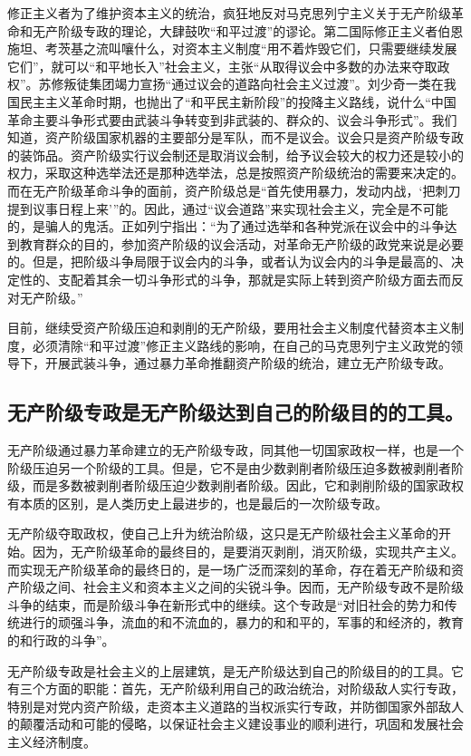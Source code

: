 \documentclass{book}
\begin{document}
修正主义者为了维护资本主义的统治，疯狂地反对马克思列宁主义关于无产阶级革命和无产阶级专政的理论，大肆鼓吹“和平过渡”的谬论。第二国际修正主义者伯恩施坦、考茨基之流叫嚷什么，对资本主义制度“用不着炸毁它们，只需要继续发展它们”，就可以“和平地长入”社会主义，主张“从取得议会中多数的办法来夺取政权”。苏修叛徒集团竭力宣扬“通过议会的道路向社会主义过渡”。刘少奇一类在我国民主主义革命时期，也抛出了“和平民主新阶段”的投降主义路线，说什么“中国革命主要斗争形式要由武装斗争转变到非武装的、群众的、议会斗争形式”。我们知道，资产阶级国家机器的主要部分是军队，而不是议会。议会只是资产阶级专政的装饰品。资产阶级实行议会制还是取消议会制，给予议会较大的权力还是较小的权力，采取这种选举法还是那种选举法，总是按照资产阶级统治的需要来决定的。而在无产阶级革命斗争的面前，资产阶级总是“首先使用暴力，发动内战，‘把刺刀提到议事日程上来’”的。因此，通过“议会道路”来实现社会主义，完全是不可能的，是骗人的鬼活。正如列宁指出：“为了通过选举和各种党派在议会中的斗争达到教育群众的目的，参加资产阶级的议会活动，对革命无产阶级的政党来说是必要的。但是，把阶级斗争局限于议会内的斗争，或者认为议会内的斗争是最高的、决定性的、支配着其余一切斗争形式的斗争，那就是实际上转到资产阶级方面去而反对无产阶级。”

目前，继续受资产阶级压迫和剥削的无产阶级，要用社会主义制度代替资本主义制度，必须清除“和平过渡”修正主义路线的影响，在自己的马克思列宁主义政党的领导下，开展武装斗争，通过暴力革命推翻资产阶级的统治，建立无产阶级专政。

\subsection{无产阶级专政是无产阶级达到自己的阶级目的的工具。}

无产阶级通过暴力革命建立的无产阶级专政，同其他一切国家政权一样，也是一个阶级压迫另一个阶级的工具。但是，它不是由少数剥削者阶级压迫多数被剥削者阶级，而是多数被剥削者阶级压迫少数剥削者阶级。因此，它和剥削阶级的国家政权有本质的区别，是人类历史上最进步的，也是最后的一次阶级专政。

无产阶级夺取政权，使自己上升为统治阶级，这只是无产阶级社会主义革命的开始。因为，无产阶级革命的最终目的，是要消灭剥削，消灭阶级，实现共产主义。而实现无产阶级革命的最终日的，是一场广泛而深刻的革命，存在着无产阶级和资产阶级之间、社会主义和资本主义之间的尖锐斗争。因而，无产阶级专政不是阶级斗争的结束，而是阶级斗争在新形式中的继续。这个专政是“对旧社会的势力和传统进行的顽强斗争，流血的和不流血的，暴力的和和平的，军事的和经济的，教育的和行政的斗争”。

无产阶级专政是社会主义的上层建筑，是无产阶级达到自己的阶级目的的工具。它有三个方面的职能：首先，无产阶级利用自己的政治统治，对阶级敌人实行专政，特别是对党内资产阶级，走资本主义道路的当权派实行专政，并防御国家外部敌人的颠覆活动和可能的侵略，以保证社会主义建设事业的顺利进行，巩固和发展社会主义经济制度。
\end{document}
